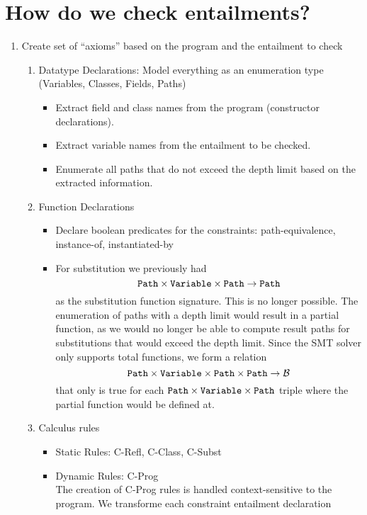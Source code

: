 \documentclass[a4paper]{article}
\begin{document}
\section{How do we check entailments?}
\begin{enumerate}
  \item Create set of ``axioms'' based on the program and the entailment to check
  \begin{enumerate}
    \item Datatype Declarations: Model everything as an enumeration type (Variables, Classes, Fields, Paths)
    \begin{itemize}
      \item Extract field and class names from the program (constructor declarations).
      \item Extract variable names from the entailment to be checked.
      \item Enumerate all paths that do not exceed the depth limit based on the extracted information.
    \end{itemize}
    \item Function Declarations
    \begin{itemize}
      \item Declare boolean predicates for the constraints: path-equivalence, instance-of, instantiated-by
      \item For substitution we previously had \[\mathtt{Path} \times \mathtt{Variable} \times \mathtt{Path} \rightarrow \mathtt{Path}\] as the substitution function signature.
            This is no longer possible. The enumeration of paths with a depth limit would result in a partial function,
            as we would no longer be able to compute result paths for substitutions that would exceed the depth limit.
            Since the SMT solver only supports total functions, we form a relation
            \[\mathtt{Path} \times \mathtt{Variable} \times \mathtt{Path} \times \mathtt{Path} \rightarrow \mathcal{B}\]
            that only is true for each $\mathtt{Path} \times \mathtt{Variable} \times \mathtt{Path}$ triple where the partial function would be defined at.
    \end{itemize}
    \item Calculus rules
    \begin{itemize}
      \item Static Rules: C-Refl, C-Class, C-Subst
      \item Dynamic Rules: C-Prog\\
            The creation of C-Prog rules is handled context-sensitive to the program.
            We transforme each constraint entailment declaration

\end{itemize}
\end{enumerate}
\end{enumerate}
\end{document}
